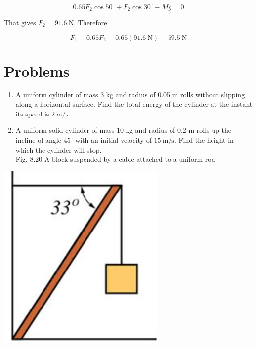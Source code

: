 \documentclass[10pt]{article}
\begin{document}
$$
0.65 F_{2} \cos 50^{\circ}+F_{2} \cos 30^{\circ}-M g=0
$$

That gives $F_{2}=91.6 \mathrm{~N}$. Therefore

$$
F_{1}=0.65 F_{2}=0.65(91.6 \mathrm{~N})=59.5 \mathrm{~N}
$$

\section*{Problems}
\begin{enumerate}
  \item A uniform cylinder of mass 3 kg and radius of 0.05 m rolls without slipping along a horizontal surface. Find the total energy of the cylinder at the instant its speed is $2 \mathrm{~m} / \mathrm{s}$.
  \item A uniform solid cylinder of mass 10 kg and radius of 0.2 m rolls up the incline of angle $45^{\circ}$ with an initial velocity of $15 \mathrm{~m} / \mathrm{s}$. Find the height in which the cylinder will stop.\\
Fig. 8.20 A block suspended by a cable attached to a uniform rod
\end{enumerate}

\begin{center}
\includegraphics[max width=\textwidth]{2024_09_13_db1f357d2aad0a03eb2eg-140(2)}
\end{center}
\end{document}
